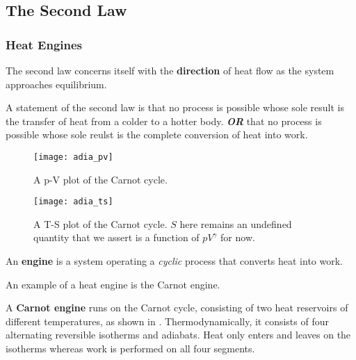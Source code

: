 \subsection{The Second Law}
\subsubsection{Heat Engines}
The second law concerns itself with the \textbf{direction} of heat flow as the system approaches equilibrium. 
\begin{defi}
\label{L2}
A statement of the second law is that no process is possible whose sole result is the transfer of heat from a colder to a hotter body. 
\textbf{\textit{OR}} that no process is possible whose sole reulst is the complete conversion of heat into work. 
\end{defi}
\begin{figure}[!htbp]
	\texttt{[image: adia\_pv]}
	\centering
	\caption{A p-V plot of the Carnot cycle.}
	\label{fig:adia_pv}
\end{figure}
\begin{figure}[!htbp]
	\texttt{[image: adia\_ts]}
	\centering
	\caption{A T-S plot of the Carnot cycle. 
	$S$ here remains an undefined quantity that we assert is a function of $pV^{\gamma}$ for now.
}
	\label{fig:adia_ts}
\end{figure}
\begin{defi}
An \textbf{engine} is a system operating a \textit{cyclic} process that converts heat into work. 
\end{defi}
An example of a heat engine is the Carnot engine. 
\begin{defi}
A \textbf{Carnot engine} runs on the Carnot cycle, consisting of two heat reservoirs of different temperatures, as shown in . 
Thermodynamically, it consists of four alternating reversible isotherms and adiabats. 
Heat only enters and leaves on the isotherms whereas work is performed on all four segments. 
\end{defi}

